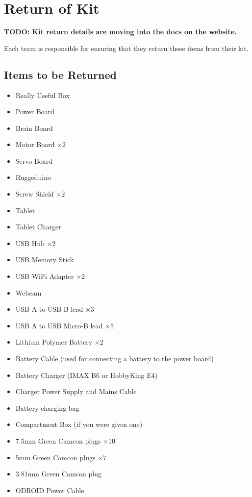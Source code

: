 \section {Return of Kit}
\label{sec:kit-return}

\textbf{TODO: Kit return details are moving into the docs on the website.}

Each team is responsible for ensuring that they return these items from their kit.

\subsection {Items to be Returned}

\begin{itemize}
 \setlength{\itemsep}{0.3em}
 \item Really Useful Box

 \item Power Board
 \item Brain Board
 \item Motor Board $\times 2$
 \item Servo Board
 \item Ruggeduino
 \item Screw Shield $\times 2$

 \item Tablet
 \item Tablet Charger

 \item USB Hub $\times 2$
 \item USB Memory Stick
 \item USB WiFi Adapter $\times 2$
 \item Webcam
 \item USB A to USB B lead $\times 3$
 \item USB A to USB Micro-B lead $\times 5$

 \item Lithium Polymer Battery $\times 2$
 \item Battery Cable (used for connecting a battery to the power board)
 \item Battery Charger (IMAX B6 or HobbyKing E4)
 \item Charger Power Supply and Mains Cable
 \item Battery charging bag

 \item Compartment Box (if you were given one)
 \item 7.5mm Green Camcon plugs $\times 10$
 \item 5mm Green Camcon plugs $\times 7$
 \item 3.81mm Green Camcon plug
 \item ODROID Power Cable
\end{itemize}

